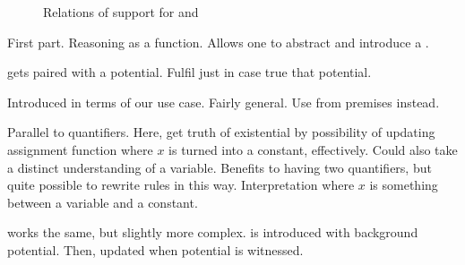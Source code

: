 \begin{note}[Figures]
  \begin{figure}[h]
    \begin{subfigure}{.5\textwidth}
      \centering
      \caption{\AR{}}
      \label{fig:AR:support}
    \end{subfigure}
    \begin{subfigure}{.5\textwidth}
      \centering
      \caption{\AR{}}
      \label{fig:AR:support}
    \end{subfigure}
    \caption{Relations of support for \AR{} and \WR{}}
    \label{fig:ARandWR:support}
  \end{figure}
\end{note}


\begin{note}
  First part.
  Reasoning as a function.
  Allows one to abstract and introduce a \future{}.

  \future{} gets paired with a potential.
  Fulfil \future{} just in case true that potential.

  Introduced in terms of our use case.
  Fairly general.
  Use from premises instead.

  Parallel to quantifiers.
  Here, get truth of existential by possibility of updating assignment function where \(x\) is turned into a constant, effectively.
  Could also take a distinct understanding of a variable.
  Benefits to having two quantifiers, but quite possible to rewrite rules in this way.
  Interpretation where \(x\) is something between a variable and a constant.

  \future{} works the same, but slightly more complex.
  \future{} is introduced with background potential.
  Then, updated when potential is witnessed.

\end{note}




